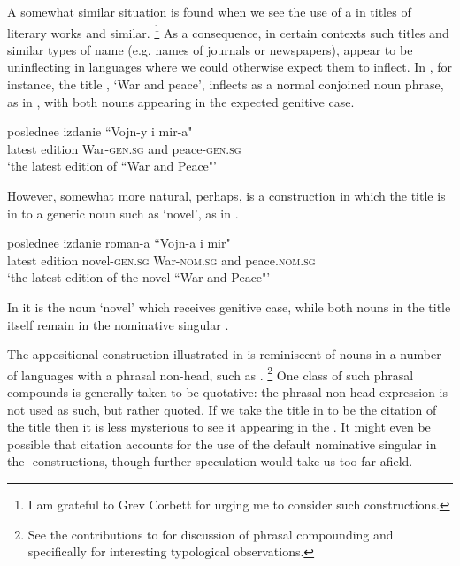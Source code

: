 \documentclass[output=paper,colorlinks,citecolor=brown]{langscibook}
\begin{document}
{
	A somewhat similar situation is found when we see the use of a  in titles of literary works and similar.%
	\footnote{%
		I am grateful to Grev Corbett for urging me to consider such constructions.
	} %
	As a consequence, in certain contexts such titles and similar types of name (e.g. names of journals or newspapers), appear to be uninflecting in languages where we could otherwise expect them to inflect. In , for instance, the title , `War and peace', inflects as a normal conjoined noun phrase, as in , with both nouns appearing in the expected genitive case.%
	
		\ea\label{vojny}
		
		\gll	poslednee	izdanie	``Vojn-y			i	mir-a"	\\
		latest		edition	War-\textsc{gen.sg}	and	peace-\textsc{gen.sg}	\\
		\glt	`the latest  edition of ``War and Peace"'
		
		\z
		However, somewhat more natural, perhaps, is a construction in which the title is in  to a generic noun such as  `novel', as in .
		
		\ea\label{romana}
		
		\gll	poslednee	izdanie	roman-a			``Vojn-a			i	mir"	\\
		latest		edition	novel-\textsc{gen.sg}	War-\textsc{nom.sg}	and	peace.\textsc{nom.sg}	\\
		\glt	`the latest  edition of  the novel ``War and Peace"'
		
		\z
		In  it is the noun `novel' which receives genitive case, while both nouns in the title itself remain in the nominative singular .
		
		The appositional construction illustrated in  is reminiscent of  nouns in a number of languages with a phrasal non-head, such as .%
		\footnote{%
			See the contributions to \citet{tripskornfilt2017} for discussion of phrasal compounding and specifically \citet{pafel2017} for interesting typological observations.
		} %
	One class of such phrasal compounds  is generally taken to be quotative: the phrasal non-head expression is not used as such, but rather quoted. If we take the title  in  to be the citation of the title then it is less mysterious to see it appearing in the . It might even be possible that  citation accounts for the use of the default nominative singular in the  -constructions, though further speculation would take us too far afield.
	
}
\end{document}
